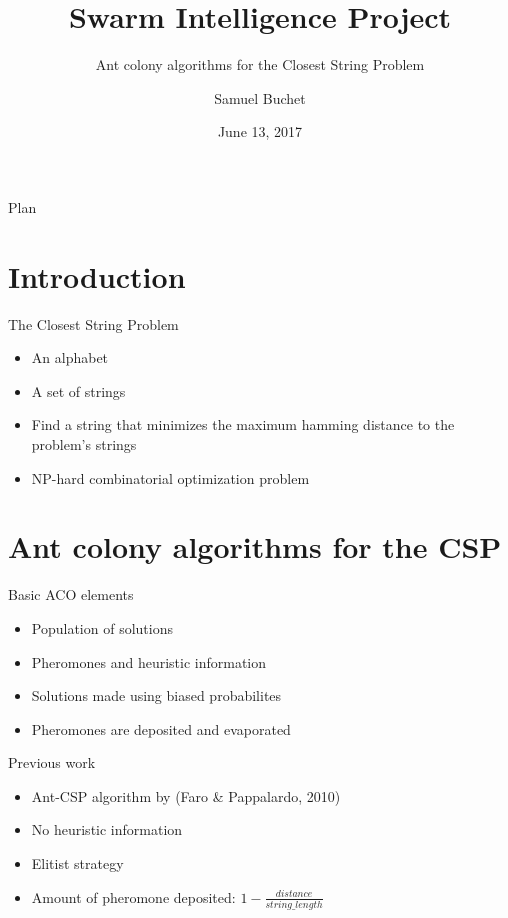 \documentclass{beamer}
\title{Swarm Intelligence Project}
\subtitle{Ant colony algorithms for the Closest String Problem}
\author{Samuel Buchet}
\institute[Université libre de Bruxelles] %
{
  Swarm Intelligence\\
  Université Libre de Bruxelles
 }
\date{June 13, 2017}
\begin{document}
\begin{frame}
  \titlepage
\end{frame}

\begin{frame}{Plan}
  \tableofcontents
\end{frame}

\section{Introduction}

\begin{frame}{The Closest String Problem}
    \begin{itemize}
        \item An alphabet
        \item A set of strings
        \item Find a string that minimizes the maximum hamming distance to the problem's strings
        \item NP-hard combinatorial optimization problem
    \end{itemize}
\end{frame}

\section{Ant colony algorithms for the CSP}

\begin{frame}{Basic ACO elements}
    \begin{itemize}
        \item Population of solutions
        \item Pheromones and heuristic information
        \item Solutions made using biased probabilites
        \item Pheromones are deposited and evaporated
    \end{itemize}
\end{frame}

\begin{frame}{Previous work}
    \begin{itemize}
        \item Ant-CSP algorithm by (Faro \& Pappalardo, 2010)
        \item No heuristic information
        \item Elitist strategy
        \item Amount of pheromone deposited: $1 - \frac{distance}{string\_length}$
    \end{itemize}
\end{frame}
\end{document}
